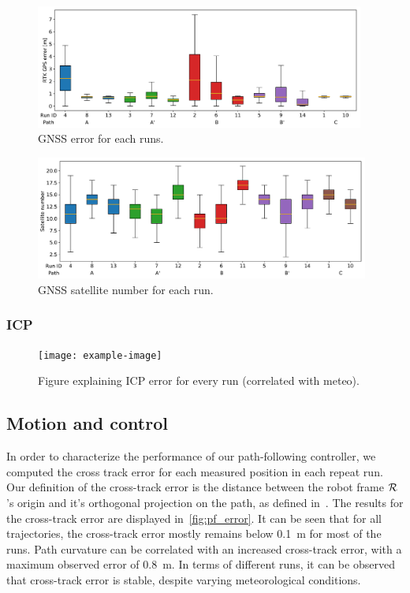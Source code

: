 \begin{figure} [htpb]
	\centering
	\includegraphics[height=1.6in]{./figs/GPS/RTK_error.pdf}
	\caption{GNSS error for each runs.}
	\label{fig:gnss_run_error}
\end{figure}

\begin{figure} [htpb]
	\centering
	\includegraphics[height=1.6in]{./figs/GPS/Satellite_number.pdf}
	\caption{GNSS satellite number for each run.}
	\label{fig:gnss_satellite_number}
\end{figure}



\subsubsection{ICP}
\label{sec:ICP}

\lightlipsum[1]

\begin{figure} [htpb]
	\centering
	\texttt{[image: example-image]}
	\caption{Figure explaining ICP error for every run (correlated with meteo).}
	\label{fig:icp_error}
\end{figure}



\subsection{Motion and control}
\label{sec:res_motion}

In order to characterize the performance of our path-following controller, we computed the cross track error for each measured position in each repeat run.
Our definition of the cross-track error is the distance between the robot frame $\mathcal{R}$'s origin and it's orthogonal projection on the path, as defined in~\citep{Mondoloni2005}.
The results for the cross-track error are displayed in~\autoref{fig:pf_error}.
It can be seen that for all trajectories, the cross-track error mostly remains below \SI{0.1}{m} for most of the runs.
Path curvature can be correlated with an increased cross-track error, with a maximum observed error of \SI{0.8}{m}.
In terms of different runs, it can be observed that cross-track error is stable, despite varying meteorological conditions. 

